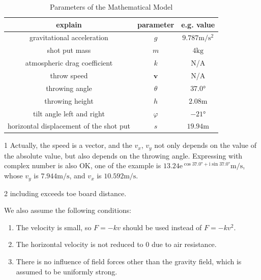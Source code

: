 \documentclass{article}
\begin{document}
\begin{table}[H]
    \centering
    \begin{threeparttable}
        \begin{tabular}{ccc}
            \hline
            \textbf{explain} & \textbf{parameter} & \textbf{e.g. value} \\
            \hline
            gravitational acceleration & $g$ & $9.787\si{\meter/\second^2}$ \\
            shot put mass & $m$ & $4\si{\kilo\gram}$ \\
            atmospheric drag coefficient & $k$ & N/A \\
            throw speed & $\boldsymbol{v}$ & N/A \tnote{1} \\
            throwing angle & $\theta$ & $37.0\si{\degree}$ \\
            throwing height & $h$ & $2.08\si{\meter}$ \\
            tilt angle left and right & $\varphi$ & $-21\si{\degree}$ \\
            horizontal displacement of the shot put \tnote{2} & $s$ & $19.94\si{\meter}$ \\
            \hline
        \end{tabular}
        \begin{tablenotes}
            \item [1] Actually, the speed is a vector, and the $v_x$, $v_y$ not only depends on the value of the absolute value, but also depends on the throwing angle. Expressing with complex number is also OK, one of the example is $13.24\mathrm{e}^{\cos37.0\si{\degree}+\mathrm{i}\sin37.0\si{\degree}}\si{\meter/\second}$, whose $v_y$ is $7.944\si{\meter/\second}$, and $v_x$ is $10.592\si{\meter/\second}$.
            \item [2] including exceeds toe board distance.
        \end{tablenotes}
    \end{threeparttable}
    \caption{Parameters of the Mathematical Model}
    \label{table:parameters}
\end{table}

We also assume the following conditions:

\begin{enumerate}
    \item The velocity is small, so $F=-kv$ should be used instead of $F=-kv^2$.
    \item The horizontal velocity is not reduced to $0$ due to air resistance.
    \item There is no influence of field forces other than the gravity field, which is assumed to be uniformly strong.
\end{enumerate}
\end{document}
